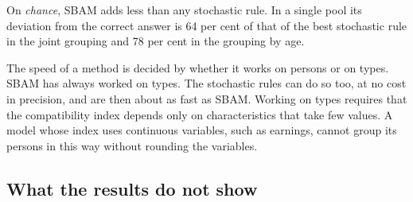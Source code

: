 \documentclass[12pt,a4paper]{article}
\begin{document}
On \emph{chance}, SBAM adds less than any stochastic rule. In a single pool its deviation from
the correct answer is 64 per cent of that of the best stochastic rule in the joint grouping and
78 per cent in the grouping by age.

The speed of a method is decided by whether it works on persons or on types. SBAM has always
worked on types. The stochastic rules can do so too, at no cost in precision, and are then about
as fast as SBAM. Working on types requires that the compatibility index depends only on
characteristics that take few values. A model whose index uses continuous variables, such as
earnings, cannot group its persons in this way without rounding the variables.

\subsection{What the results do not show}
\end{document}
